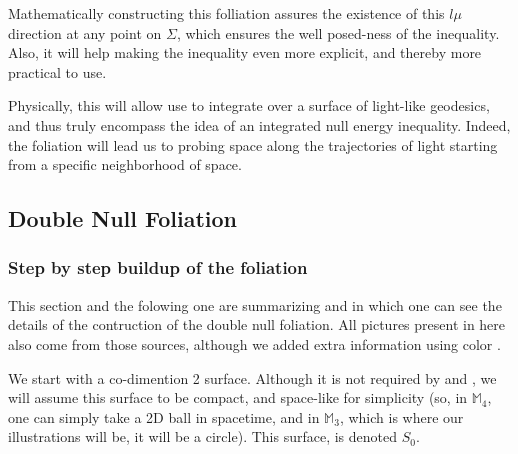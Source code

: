 \documentclass[a4paper,11pt]{article}
\numberwithin{equation}{section}
\theoremstyle{definition}
\begin{document}
Mathematically constructing this folliation assures the existence of this $l\mu$ direction at any point on $\Sigma$, which ensures the well posed-ness of the inequality. Also, it will help making the inequality even more explicit, and thereby more practical to use.

Physically, this will allow use to integrate over a surface of light-like geodesics, and thus truly encompass the idea of an integrated null energy inequality. Indeed, the foliation will lead us to probing space along the trajectories of light starting from a specific neighborhood of space.



\subsection{Double Null Foliation}
\subsubsection{Step by step buildup of the foliation}
This section and the folowing one are summarizing \cite{Chris} and \cite{Art} in which one can see the details of the contruction of the double null foliation. All pictures present in here also come from those sources, \color{red} although we added extra information using color \color{black}.

We start with a co-dimention 2 surface. Although it is not required by \cite{Chris} and \cite{Art}, we will assume this surface to be compact, and space-like for simplicity (so, in $\mathbb{M}_4$, one can simply take a 2D ball in spacetime, and in $\mathbb{M}_3$, which is where our illustrations will be, it will be a circle). This surface, is denoted $S_0$.
\end{document}

